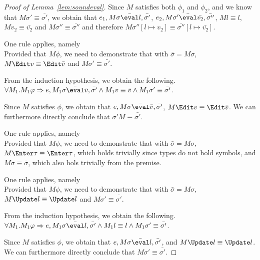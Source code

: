 \begin{proof}[Proof of Lemma~\ref{lem:soundeval}]
{  Since $M$ satisfies both $\phi_1$ and $\phi_2$, and we know that $M\sigma'\equiv \bar{\sigma'}$,
  we obtain that $e_1,M\sigma \bar{\eval}l,\bar{\sigma'}$,
  $e_2,M\sigma'\bar{\eval}\bar{v_2},\bar{\sigma''}$,
  $M l\equiv l$, $M v_2 \equiv \bar{v_2}$ and $M\sigma''\equiv\bar{\sigma''}$ and therefore $M\sigma''[l\mapsto v_2]\equiv\bar{\sigma''}[l\mapsto\bar{v_2}]$.
  }

  {One rule applies, namely \\
  Provided that $M\phi$,
  we need to demonstrate that  with $\bar{\sigma}=M\sigma$,
  $M \Edit v \equiv \Edit \bar{v}$ and $M\sigma'\equiv\bar{\sigma'}$.

  From the induction hypothesis, we obtain the following.\\
  $\forall M_1 .  M_1\phi \implies e, M_1\sigma \bar{\eval}\bar{v},\bar{\sigma'}\land  M_1v\equiv \bar{v} \land  M_1\sigma'\equiv\bar{\sigma'}$.

  Since $M$ satisfies $\phi$,
  we obtain that $e,M\sigma \bar{\eval}\bar{v},\bar{\sigma'}$,
  $M \Edit v\equiv \Edit \bar{v}$.
  We can furthermore directly conclude that $\sigma' M\equiv\bar{\sigma'}$.

  }

  {
  One rule applies, namely \\
  Provided that $M\phi$, we need to demonstrate that  with $\bar{\sigma}=M\sigma$,
  $M \Enter \tau \equiv \Enter \tau$, which holds trivially since types do not hold symbols,
  and $M\sigma\equiv\bar{\sigma}$, which also hols trivially from the premise.
  }

  {One rule applies, namely \\
  Provided that $M\phi$, we need to demonstrate that  with $\bar{\sigma}=M\sigma$,
  $M \Update l \equiv \Update l$ and $M\sigma'\equiv\bar{\sigma'}$.

  From the induction hypothesis, we obtain the following.\\
  $\forall M_1 .  M_1\phi \implies e, M_1\sigma \bar{\eval}l,\bar{\sigma'}\land  M_1 l\equiv l \land  M_1\sigma'\equiv\bar{\sigma'}$.

  Since $M$ satisfies $\phi$,
  we obtain that $e,M\sigma \bar{\eval}l,\bar{\sigma'}$,
  and $M \Update l\equiv \Update l$.
  We can furthermore directly conclude that $M \sigma' \equiv\bar{\sigma'}$.

  }


\end{proof}
